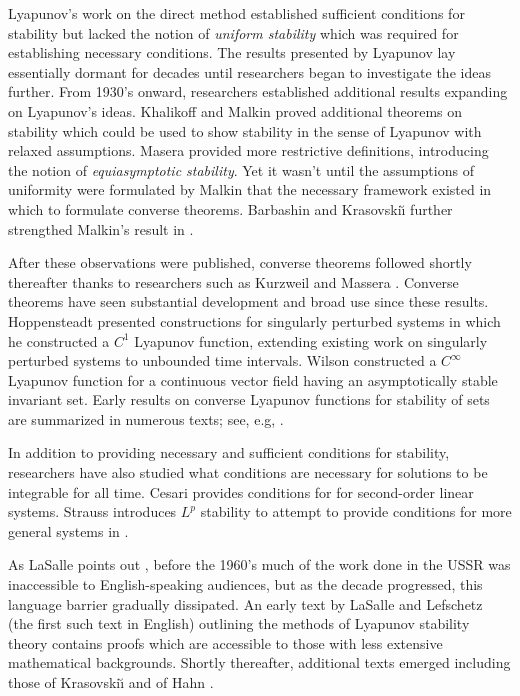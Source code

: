 Lyapunov's work on the direct method established sufficient conditions for
stability but lacked the notion of {\em uniform stability} which was required
for establishing necessary conditions.
%
The results presented by Lyapunov lay essentially dormant for decades until
researchers began to investigate the ideas further.
%
From 1930's onward, researchers established additional results expanding on
Lyapunov's ideas.
%
Khalikoff \cite{Khalikoff1937} and Malkin \cite{Malkin1938} proved additional
theorems on stability which could be used to show stability in the sense of
Lyapunov with relaxed assumptions.
%
Masera \cite{Massera1949} provided more restrictive definitions, introducing the
notion of {\em equiasymptotic stability}.
%
Yet it wasn't until the assumptions of uniformity were formulated by Malkin
\cite{Malkin1954} that the necessary framework existed in which to formulate
converse theorems.
%
Barbashin and Krasovski\u{\i} further strengthed Malkin's result in \cite{Barbashin1954}.
%

After these observations were published, converse theorems followed shortly
thereafter thanks to researchers such as Kurzweil \cite{Kurzweil1956} and
Massera \cite{Massera1956}.
%
Converse theorems have seen substantial development and broad use since these results.
%
Hoppensteadt \cite{Hoppensteadt1966} presented constructions for singularly
perturbed systems in which he constructed a $C^{1}$ Lyapunov function, extending
existing work on singularly perturbed systems to unbounded time intervals.
%
Wilson \cite{Wilson1969} constructed a $C^{\infty}$ Lyapunov function for a
continuous vector field having an asymptotically stable invariant set.
%
Early results on converse Lyapunov functions for stability of sets are
summarized in numerous texts; see, e.g, \cite{Antosiewicz1958,Yoshizawa1975}.

In addition to providing necessary and sufficient conditions for stability,
researchers have also studied what conditions are necessary for solutions to be
integrable for all time.
%
Cesari provides conditions  for \cite[\S 1.5]{Cesari1971} for second-order
linear systems.
%
Strauss introduces $L^{p}$ stability to attempt to provide conditions for more
general systems in \cite{Strauss1965}.

As LaSalle points out \cite{LaSalle1964}, before the 1960's much of the work
done in the USSR was inaccessible to English-speaking audiences, but as the
decade progressed, this language barrier gradually dissipated.
%
An early text by LaSalle and Lefschetz (the first such text in English)
\cite{LaSalle1961} outlining the methods of Lyapunov stability theory contains
proofs which are accessible to those with less extensive mathematical
backgrounds.
%
Shortly thereafter, additional texts emerged including those of Krasovski\u{\i}
\cite{Krasovskii1963} and of Hahn \cite{Hahn1967}.

